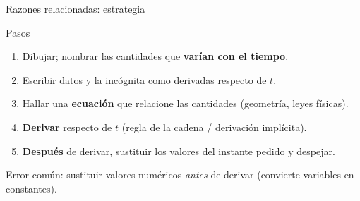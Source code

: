 \documentclass[10pt,aspectratio=169]{beamer}
\begin{document}
\begin{frame}{Razones relacionadas: estrategia}
  \begin{block}{Pasos}
    \begin{enumerate}
      \item Dibujar; nombrar las cantidades que \textbf{varían con el tiempo}.
      \item Escribir datos y la incógnita como derivadas respecto de $t$.
      \item Hallar una \textbf{ecuación} que relacione las cantidades (geometría, leyes físicas).
      \item \textbf{Derivar} respecto de $t$ (regla de la cadena / derivación implícita).
      \item \textbf{Después} de derivar, sustituir los valores del instante pedido y despejar.
    \end{enumerate}
  \end{block}
  \begin{observacion}
    Error común: sustituir valores numéricos \emph{antes} de derivar (convierte variables en constantes).
  \end{observacion}
\end{frame}
\end{document}
